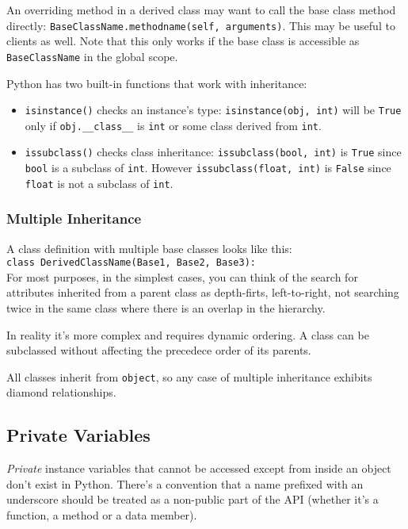 An overriding method in a derived class
may want to call the base class method directly:
\verb=BaseClassName.methodname(self, arguments)=.
This may be useful to clients as well.
Note that this only works
if the base class is accessible as \verb=BaseClassName= in the global scope.

Python has two built-in functions that work with inheritance:

\begin{itemize}
\item
\verb=isinstance()= checks an instance's type:
\verb=isinstance(obj, int)= will be \verb=True=
only if \verb=obj.__class__=
is \verb=int= or some class derived from \verb=int=.

\item
\verb=issubclass()= checks class inheritance:
\verb=issubclass(bool, int)= is \verb=True=
since \verb=bool= is a subclass of \verb=int=.
However \verb=issubclass(float, int)= is \verb=False=
since \verb=float= is not a subclass of \verb=int=.
\end{itemize}


\subsubsection{Multiple Inheritance}

A class definition with multiple base classes looks like this:\\
\verb=class DerivedClassName(Base1, Base2, Base3):=\\
For most purposes, in the simplest cases,
you can think of the search for attributes inherited from a parent class
as depth-firts, left-to-right, not searching twice in the same class
where there is an overlap in the hierarchy.

In reality it's more complex and requires dynamic ordering.
A class can be subclassed without affecting the precedece order of its parents.

All classes inherit from \verb=object=,
so any case of multiple inheritance exhibits diamond relationships.


\subsection{Private Variables}

\emph{Private} instance variables that cannot be accessed
except from inside an object don't exist in Python.
There's a convention that a name prefixed with an underscore
should be treated as a non-public part of the API
(whether it's a function, a method or a data member).

